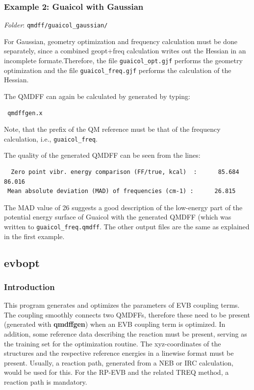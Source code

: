 \documentclass[12pt,a4paper]{scrartcl}
\begin{document}
\subsubsection{Example 2: Guaicol with Gaussian} 

\textit{Folder}: \texttt{qmdff/guaicol\_gaussian/} \newline

For Gaussian, geometry optimization and frequency calculation must be done separately, 
since a combined geopt+freq calculation writes out the Hessian in an incomplete formate.Therefore, the file \texttt{guaicol\_opt.gjf} performs the geometry optimization 
and the file \texttt{guaicol\_freq.gjf} performs the calculation of the Hessian.

The QMDFF can again be calculated by generated by typing:

\begin{verbatim}
 qmdffgen.x
\end{verbatim}

Note, that the prefix of the QM reference must be that of the frequency calculation, i.e.,
\texttt{guaicol\_freq}. 

The quality of the generated QMDFF can be seen from the lines:

\begin{verbatim}
  Zero point vibr. energy comparison (FF/true, kcal)  :      85.684      86.016
 Mean absolute deviation (MAD) of frequencies (cm-1) :      26.815
\end{verbatim}

The MAD value of 26 suggests a good description of the low-energy part of the 
potential energy surface of Guaicol with the generated QMDFF (which was written 
to \texttt{guaicol\_freq.qmdff}. 
The other output files are the same as explained in the first example. 

\subsection{evbopt}

\subsubsection{Introduction}

This program generates and optimizes the parameters of EVB coupling terms.
The coupling smoothly connects two QMDFFs, therefore these need to be present (generated with
\textbf{qmdffgen}) when an EVB coupling term is optimized.
In addition, some reference data describing the reaction must be present, serving as the 
training set for the optimization routine. The xyz-coordinates of the structures and the 
respective reference energies in a linewise format must be present.
Usually, a reaction path, generated from a NEB or IRC calculation, would be used for this.
For the RP-EVB and the related TREQ method, a reaction path is mandatory.
\end{document}
